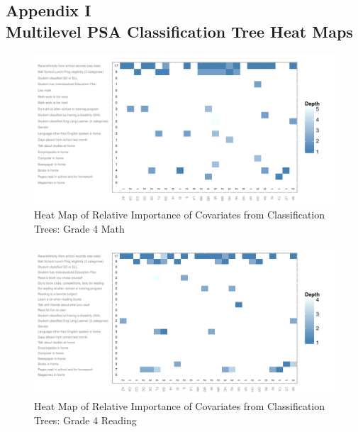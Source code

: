 %
%
%
%



\clearpage
{}
\subsection*{Appendix I\\Multilevel PSA Classification Tree Heat Maps}
\label{appendixtree}

\begin{figure}[h!]
\begin{center}
\includegraphics[height=.37\textheight]{../Figures2009/g4math-mlpsa-ctree-heat.pdf}
\caption{Heat Map of Relative Importance of Covariates from Classification Trees: Grade 4 Math}
\label{fig:g4math-mlpsa-ctree-heat}
\end{center}
\end{figure}

\begin{figure}[h!]
\begin{center}
\includegraphics[height=.37\textheight]{../Figures2009/g4read-mlpsa-ctree-heat.pdf}
\caption{Heat Map of Relative Importance of Covariates from Classification Trees: Grade 4 Reading}
\label{fig:g4read-mlpsa-ctree-heat}
\end{center}
\end{figure}

